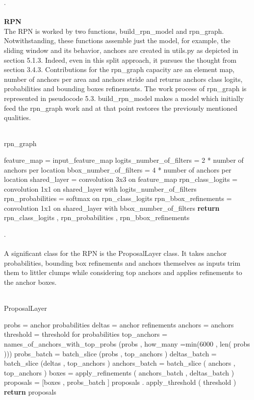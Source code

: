 .\\
\\
 \textbf{RPN}
\\
The RPN is worked by two functions, build\_rpn\_model and rpn\_graph. Notwithstanding, these functions assemble just the model, for example, the sliding window and its behavior, anchors are created in utils.py as depicted in section 5.1.3. Indeed, even in this split approach, it pursues the thought from section 3.4.3. Contributions for the rpn\_graph capacity are an element map, number of anchors per area and anchors stride and returns anchors class logits, probabilities and bounding boxes refinements. The work process of rpn\_graph is represented in pseudocode 5.3. build\_rpn\_model makes a model which initially feed the rpn\_graph work and at that point restores the previously mentioned qualities.
\\
\\
\begin{algorithm}[H]
  \caption{rpn\_graph}
  \SetAlgoLined
  \DontPrintSemicolon
  feature\_map = input\_feature\_map\;
  logits\_number\_of\_filters = 2 * number of anchors per location\;
   bbox\_number\_of\_filters = 4 * number of anchors per location\;
   shared\_layer = convolution 3x3 on feature\_map\;
   rpn\_class\_logits = convolution 1x1 on shared\_layer with logits\_number\_of\_filters\;
  rpn\_probabilities = softmax on rpn\_class\_logits\;
   rpn\_bbox\_refinements = convolution 1x1 on shared\_layer with bbox\_number\_of\_filters\;
   \textbf{return} rpn\_class\_logits , rpn\_probabilities , rpn\_bbox\_refinements\;
  
  \end{algorithm}
  .\\
\\
  A significant class for the RPN is the ProposalLayer class. It takes anchor probabilities, bounding box refinements and anchors themselves as inputs trim them to littler clumps while considering top anchors and applies refinements to the anchor boxes.
\\
\\
\begin{algorithm}[H]
  \caption{ProposalLayer}
  \SetAlgoLined
  \DontPrintSemicolon

probs = anchor probabilities\;
deltas = anchor refinements\;
anchors = anchors\;
threshold = threshold for probabilities\;
top\_anchors = names\_of\_anchors\_with\_top\_probs (probs , how\_many =min(6000 , len( probs )))\;
 probs\_batch = batch\_slice (probs , top\_anchors )\;
 deltas\_batch = batch\_slice (deltas , top\_anchors )\;
 anchors\_batch = batch\_slice ( anchors , top\_anchors )\;
 boxes = apply\_refinements ( anchors\_batch , deltas\_batch )\;
 proposals = [boxes , probs\_batch ]\;
 proposals . apply\_threshold ( threshold )\;
 \textbf{return} proposals\;

  \end{algorithm}
